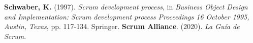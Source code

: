 \documentclass[letterpaper, 10pt]{article}
\begin{document}


\tableofcontents
\listoftables
\listoffigures
\clearpage



\begin{thebibliography}{a}
     \textbf{Schwaber, K.} (1997). \textit{Scrum development process}, in \textit{Business Object Design and Implementation: Scrum development process Proceedings 16 October 1995, Austin, Texas}, pp. 117-134. Springer.
         \textbf{Scrum Alliance}. (2020). \textit{La Guía de Scrum}. 
\end{thebibliography}
\end{document}
